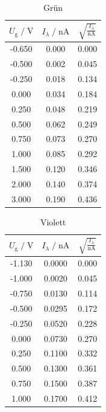 \begin{table}
    \centering
    \caption{Grün}
    \label{tab:gruen}
    \begin{tabular}{c c c}
    \toprule
    $ U_\text{g} \;/\; \si{\volt} $ & $I_\lambda \;/\; \si{\nano\ampere}$ &
    $ \sqrt{\frac{I_\lambda}{\si{\nano\ampere}}}$\\
    \midrule 
       -0.650 & 0.000 & 0.000\\   
       -0.500 & 0.002 & 0.045\\  
       -0.250 & 0.018 & 0.134\\  
        0.000 & 0.034 & 0.184\\ 
        0.250 & 0.048 & 0.219\\  
        0.500 & 0.062 & 0.249\\
        0.750 & 0.073 & 0.270\\  
        1.000 & 0.085 & 0.292\\  
        1.500 & 0.120 & 0.346\\ 
        2.000 & 0.140 & 0.374\\ 
        3.000 & 0.190 & 0.436\\       
    \bottomrule
    \end{tabular}
\end{table}

\begin{table}
    \centering
    \caption{Violett}
    \label{tab:viol}
    \begin{tabular}{c c c}
    \toprule
    $ U_\text{g} \;/\; \si{\volt} $ & $I_\lambda \;/\; \si{\nano\ampere}$ &
    $ \sqrt{\frac{I_\lambda}{\si{\nano\ampere}}}$\\
    \midrule 
      -1.130 & 0.0000 & 0.000\\
      -1.000 & 0.0020 & 0.045\\
      -0.750 & 0.0130 & 0.114\\
      -0.500 & 0.0295 & 0.172\\
      -0.250 & 0.0520 & 0.228\\
       0.000 & 0.0730 & 0.270\\
       0.250 & 0.1100 & 0.332\\
       0.500 & 0.1300 & 0.361\\
       0.750 & 0.1500 & 0.387\\
       1.000 & 0.1700 & 0.412\\     
    \bottomrule
    \end{tabular}
\end{table}

